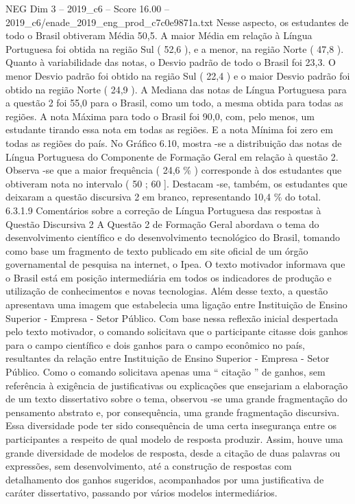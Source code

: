 \begin{textsample}{NEG Dim 3 – 2019\_c6 – Score 16.00 – 2019\_c6/enade\_2019\_eng\_prod\_c7c0e9871a.txt}
Nesse aspecto, os estudantes de todo o Brasil obtiveram Média 50,5.
A maior Média em relação à Língua Portuguesa foi obtida na região Sul ( 52,6 ), e a menor, na região Norte ( 47,8 ).
Quanto à variabilidade das notas, o Desvio padrão de todo o Brasil foi 23,3.
O menor Desvio padrão foi obtido na região Sul ( 22,4 ) e o maior Desvio padrão foi obtido na região Norte ( 24,9 ).
A Mediana das notas de Língua Portuguesa para a questão 2 foi 55,0 para o Brasil, como um todo, a mesma obtida para todas as regiões.
A nota Máxima para todo o Brasil foi 90,0, com, pelo menos, um estudante tirando essa nota em todas as regiões.
E a nota Mínima foi zero em todas as regiões do país.
No Gráfico 6.10, mostra -se a distribuição das notas de Língua Portuguesa do Componente de Formação Geral em relação à questão 2.
Observa -se que a maior frequência ( 24,6 \% ) corresponde à dos estudantes que obtiveram nota no intervalo ( 50 ; 60 ].
Destacam -se, também, os estudantes que deixaram a questão discursiva 2 em branco, representando 10,4 \% do total. 6.3.1.9 Comentários sobre a correção de Língua Portuguesa das respostas à Questão Discursiva 2 A Questão 2 de Formação Geral abordava o tema do desenvolvimento científico e do desenvolvimento tecnológico do Brasil, tomando como base um fragmento de texto publicado em site oficial de um órgão governamental de pesquisa na internet, o Ipea.
O texto motivador informava que o Brasil está em posição intermediária em todos os indicadores de produção e utilização de conhecimentos e novas tecnologias.
Além desse texto, a questão apresentava uma imagem que estabelecia uma ligação entre Instituição de Ensino Superior - Empresa - Setor Público.
Com base nessa reflexão inicial despertada pelo texto motivador, o comando solicitava que o participante citasse dois ganhos para o campo científico e dois ganhos para o campo econômico no país, resultantes da relação entre Instituição de Ensino Superior - Empresa - Setor Público.
Como o comando solicitava apenas uma “ citação ” de ganhos, sem referência à exigência de justificativas ou explicações que ensejariam a elaboração de um texto dissertativo sobre o tema, observou -se uma grande fragmentação do pensamento abstrato e, por consequência, uma grande fragmentação discursiva.
Essa diversidade pode ter sido consequência de uma certa insegurança entre os participantes a respeito de qual modelo de resposta produzir.
Assim, houve uma grande diversidade de modelos de resposta, desde a citação de duas palavras ou expressões, sem desenvolvimento, até a construção de respostas com detalhamento dos ganhos sugeridos, acompanhados por uma justificativa de caráter dissertativo, passando por vários modelos intermediários.

\end{textsample}

